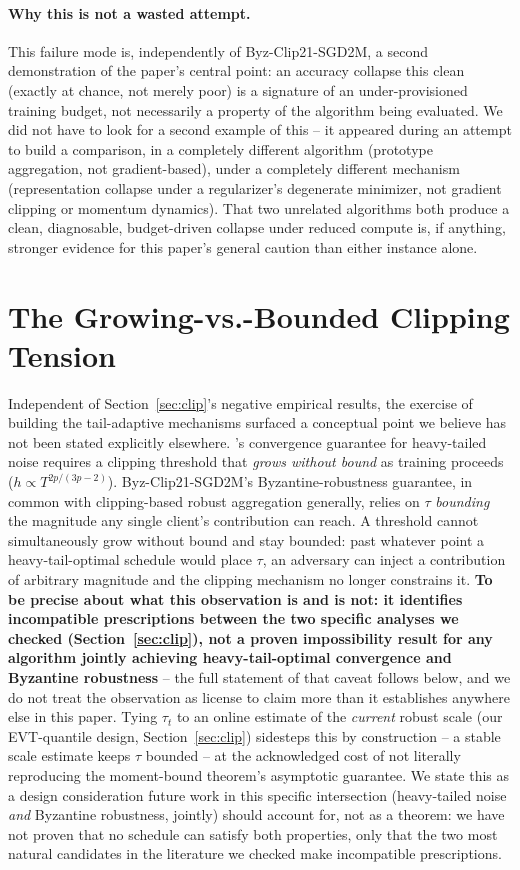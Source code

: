 \documentclass{article}
\begin{document}
\paragraph{Why this is not a wasted attempt.} This failure mode is, independently
of Byz-Clip21-SGD2M, a second demonstration of the paper's central point: an
accuracy collapse this clean (exactly at chance, not merely poor) is a signature
of an under-provisioned training budget, not necessarily a property of the
algorithm being evaluated. We did not have to look for a second example of this
-- it appeared during an attempt to build a comparison, in a completely
different algorithm (prototype aggregation, not gradient-based), under a
completely different mechanism (representation collapse under a regularizer's
degenerate minimizer, not gradient clipping or momentum dynamics). That two
unrelated algorithms both produce a clean, diagnosable, budget-driven collapse
under reduced compute is, if anything, stronger evidence for this paper's
general caution than either instance alone.

\section{The Growing-vs.-Bounded Clipping Tension}
\label{sec:tension}

Independent of Section~\ref{sec:clip}'s negative empirical results, the exercise
of building the tail-adaptive mechanisms surfaced a conceptual point we believe
has not been stated explicitly elsewhere. \citet{sun2024gradnorm}'s
convergence guarantee for heavy-tailed noise requires a clipping threshold that
\emph{grows without bound} as training proceeds ($h \propto
T^{2p/(3p-2)}$). Byz-Clip21-SGD2M's Byzantine-robustness guarantee, in common
with clipping-based robust aggregation generally, relies on $\tau$
\emph{bounding} the magnitude any single client's contribution can reach. A
threshold cannot simultaneously grow without bound and stay bounded: past
whatever point a heavy-tail-optimal schedule would place $\tau$, an adversary
can inject a contribution of arbitrary magnitude and the clipping mechanism no
longer constrains it. \textbf{To be precise about what this observation is and
is not: it identifies incompatible prescriptions between the two specific
analyses we checked (Section~\ref{sec:clip}), not a proven impossibility result
for any algorithm jointly achieving heavy-tail-optimal convergence and
Byzantine robustness} -- the full statement of that caveat follows below, and
we do not treat the observation as license to claim more than it establishes
anywhere else in this paper. Tying $\tau_t$ to an online estimate of the \emph{current}
robust scale (our EVT-quantile design, Section~\ref{sec:clip}) sidesteps this by
construction -- a stable scale estimate keeps $\tau$ bounded -- at the
acknowledged cost of not literally reproducing the moment-bound theorem's
asymptotic guarantee. We state this as a design consideration future work in
this specific intersection (heavy-tailed noise \emph{and} Byzantine robustness,
jointly) should account for, not as a theorem: we have not proven that no
schedule can satisfy both properties, only that the two most natural candidates
in the literature we checked make incompatible prescriptions.
\end{document}
